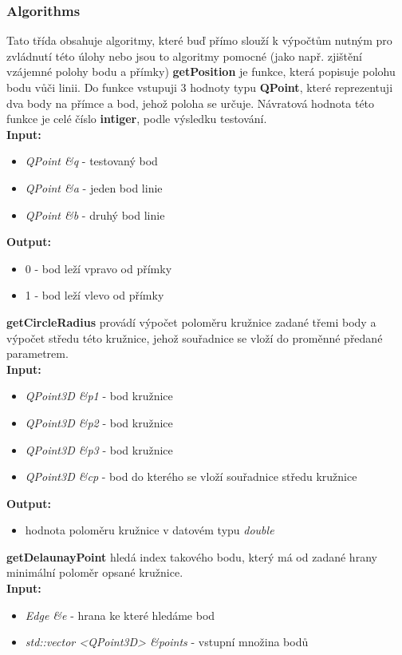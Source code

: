 \documentclass{article}
\begin{document}
\subsubsection{Algorithms} 
 
Tato třída obsahuje algoritmy, které buď přímo slouží k výpočtům nutným pro zvládnutí této úlohy nebo jsou to algoritmy pomocné (jako např. zjištění vzájemné polohy bodu a přímky)
\bigskip
\textbf{getPosition} je funkce, která popisuje polohu bodu vůči linii. Do funkce vstupuji 3 hodnoty typu  \textbf{QPoint}, které reprezentuji dva body na přímce a bod, jehož poloha se určuje. Návratová hodnota této funkce je celé číslo \textbf{intiger}, podle výsledku testování.\\ 
 \textbf{Input:}
\begin{itemize} 
\item \textit{QPoint \&q} - testovaný bod
\item \textit{QPoint \&a} - jeden bod linie
\item \textit{QPoint \&b} - druhý bod linie
\end{itemize}
 \textbf{Output:}
\begin{itemize} 
\item 0 - bod leží vpravo od přímky
\item 1 - bod leží vlevo od přímky 
\end{itemize} 
\bigskip
\textbf{getCircleRadius} provádí výpočet poloměru kružnice zadané třemi body a výpočet středu této kružnice, jehož souřadnice se vloží do proměnné předané parametrem.\\
 \textbf{Input:}
\begin{itemize} 
\item \textit{QPoint3D \&p1} - bod kružnice
\item \textit{QPoint3D \&p2} - bod kružnice
\item \textit{QPoint3D \&p3} - bod kružnice
\item \textit{QPoint3D \&cp} - bod do kterého se vloží souřadnice středu kružnice
\end{itemize}
 \textbf{Output:}
\begin{itemize} 
\item hodnota poloměru kružnice v datovém typu \textit{double}
\end{itemize}
\bigskip
\textbf{getDelaunayPoint} hledá index takového bodu, který má od zadané hrany minimální poloměr opsané kružnice.\\
 \textbf{Input:}
\begin{itemize} 
\item \textit{Edge \&e} - hrana ke které hledáme bod
\item \textit{std::vector <QPoint3D> \&points} - vstupní množina bodů
\end{itemize}
\end{document}
